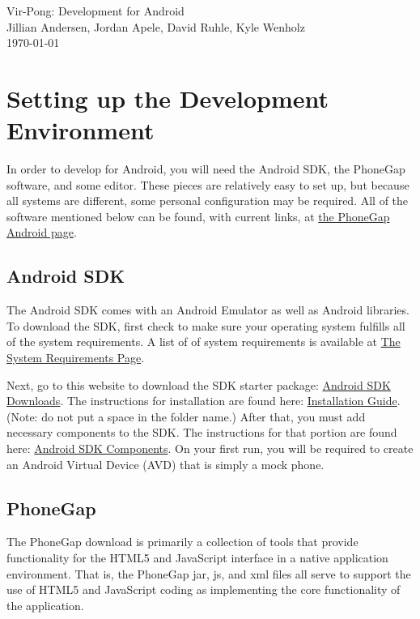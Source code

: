 \documentclass[12pt]{article}
\begin{document}
 \begin{titlepage}
    \vspace*{\fill}
    \begin{center}
      {\Huge Vir-Pong: Development for Android}\\[0.5cm]
      {\Large Jillian Andersen, Jordan Apele, David Ruhle, Kyle Wenholz}\\[0.4cm]
      \today
    \end{center}
    \vspace*{\fill}
  \end{titlepage}

\tableofcontents
\newpage

\section{Setting up the Development Environment}
In order to develop for Android, you will need the Android SDK, the PhoneGap software, and some editor.  These pieces are relatively easy to set up, but because all systems are different, some personal configuration may be required.  All of the software mentioned below can be found, with current links, at \href{http://www.phonegap.com/start#android}{the PhoneGap Android page}.  

\subsection{Android SDK}
The Android SDK comes with an Android Emulator as well as Android libraries.
To download the SDK, first check to make sure your operating system fulfills all of the system requirements.  A list of of system requirements is available at \href{http://developer.android.com/sdk/requirements.html}{The System Requirements Page}.

Next, go to this website to download the SDK starter package: \href{http://developer.android.com/sdk/index.html}{Android SDK Downloads}.
The instructions for installation are found here: \href{http://developer.android.com/sdk/installing.html}{Installation Guide}. (Note: do not put a space in the folder name.)
After that, you must add necessary components to the SDK.  The instructions for that portion are found here: \href{http://developer.android.com/sdk/adding-components.html}{Android SDK Components}.  On your first run, you will be required to create an Android Virtual Device (AVD) that is simply a mock phone.


\subsection{PhoneGap}
The PhoneGap download is primarily a collection of tools that provide functionality for the HTML5 and JavaScript interface in a native application environment.  That is, the PhoneGap jar, js, and xml files all serve to support the use of HTML5 and JavaScript coding as implementing the core functionality of the application.   
\end{document}
